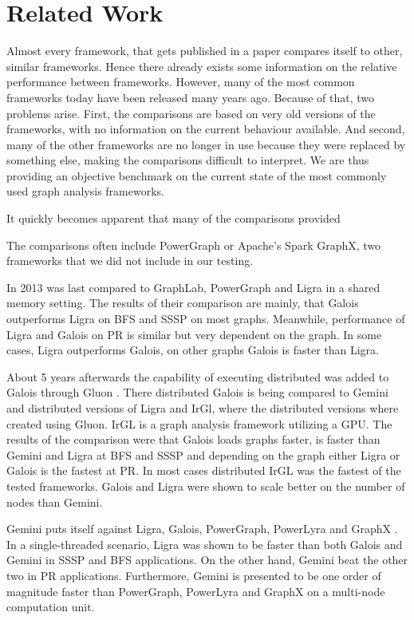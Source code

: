

\section{Related Work}

Almost every framework, that gets published in a paper compares itself to other, similar frameworks. 
Hence there already exists some information on the relative performance between frameworks. 
However, many of the most common frameworks today have been released many years ago. 
Because of that, two problems arise.
First, the comparisons are based on very old versions of the frameworks, with no information on the current behaviour available. 
And second, many of the other frameworks are no longer in use because they were replaced by something else, making the comparisons difficult to interpret.
We are thus providing an objective benchmark on the current state of the most commonly used graph analysis frameworks. 

It quickly becomes apparent that many of the comparisons provided 

The comparisons often include PowerGraph or Apache's Spark GraphX, two frameworks that we did not include in our testing.




In 2013 \cite{Galois} was last compared to GraphLab, PowerGraph and Ligra in a shared memory setting. The results of their comparison are mainly, that Galois outperforms Ligra on BFS and SSSP on most graphs. Meanwhile, performance of Ligra and Galois on PR is similar but very dependent on the graph. In some cases, Ligra outperforms Galois, on other graphs Galois is faster than Ligra.

About 5 years afterwards the capability of executing distributed was added to Galois through Gluon \cite{vertGalois}. 
There distributed Galois is being compared to Gemini and distributed versions of Ligra and IrGl, where the distributed versions where created using Gluon. 
IrGL is a graph analysis framework utilizing a GPU. 
The results of the comparison were that Galois loads graphs faster, is faster than Gemini and Ligra at BFS and SSSP and depending on the graph either Ligra or Galois is the fastest at PR. 
In most cases distributed IrGL was the fastest of the tested frameworks. 
Galois and Ligra were shown to scale better on the number of nodes than Gemini.

Gemini puts itself against Ligra, Galois, PowerGraph, PowerLyra and GraphX \cite{Gemini}.
In a single-threaded scenario, Ligra was shown to be faster than both Galois and Gemini in SSSP and BFS applications. 
On the other hand, Gemini beat the other two in PR applications.
Furthermore, Gemini is presented to be one order of magnitude faster than PowerGraph, PowerLyra and GraphX on a multi-node computation unit.

